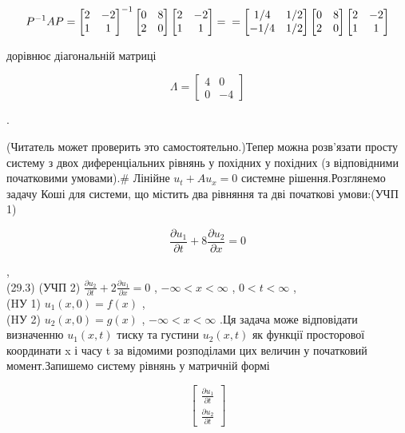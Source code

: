 \documentclass[
  ukrainian,
]{article}
\begin{document}
\[
P^{-1}AP =
\begin{bmatrix} 2 & -2 \\ 1 & 1 \end{bmatrix}
^{-1}
\begin{bmatrix} 0 & 8 \\ 2 & 0 \end{bmatrix}
\begin{bmatrix} 2 & -2 \\ 1 & 1 \end{bmatrix}
= \\ =
\begin{bmatrix} 1/4 & 1/2 \\ -1/4 & 1/2 \end{bmatrix}
\begin{bmatrix} 0 & 8 \\ 2 & 0 \end{bmatrix}
\begin{bmatrix} 2 & -2 \\ 1 & 1 \end{bmatrix}
\]

дорівнює діагональній матриці

\[
\Lambda =
\begin{bmatrix} 4 & 0 \\ 0 & -4 \end{bmatrix}
\]

.

(Читатель может проверить это самостоятельно.)Тепер можна розв'язати
просту систему з двох диференціальних рівнянь у похідних у похідних (з
відповідними початковими умовами).\# Лінійне \(u_t + Au_x = 0\) системне
рішення.Розглянемо задачу Коші для системи, що містить два рівняння та
дві початкові умови:(УЧП 1)

\[
\frac{\partial u_1}{\partial t} + 8 \frac{\partial u_2}{\partial x} = 0
\]

,\\
(29.3) (УЧП 2)
\(\frac{\partial u_2}{\partial t} + 2 \frac{\partial u_1}{\partial x} = 0\)
, \(-\infty < x < \infty\) , \(0 < t < \infty\) ,\\
(HУ 1) \(u_1(x, 0) = f(x)\) ,\\
(HУ 2) \(u_2(x, 0) = g(x)\) , \(-\infty < x < \infty\) .Ця задача може
відповідати визначенню \(u_1(x, t)\) тиску та густини \(u_2(x, t)\) як
функції просторової координати x і часу t за відомими розподілами цих
величин у початковий момент.Запишемо систему рівнянь у матричній формі

\[
\begin{bmatrix} \frac{\partial u_1}{\partial t} \\ \frac{\partial u_2}{\partial t} \end{bmatrix}
\]
\end{document}
